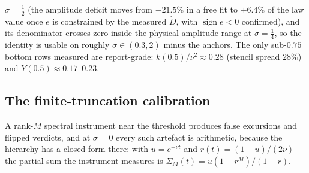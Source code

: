 \documentclass[11pt,a4paper]{article}
\theoremstyle{plain}
\theoremstyle{definition}
\begin{document}
$\sigma=\tfrac12$ (the amplitude deficit moves from $-21.5\%$ in a free fit to $+6.4\%$ of the law value once $e$ is constrained by the measured $\dot D$, with $\operatorname{sign}e<0$ confirmed), and its denominator crosses zero inside the physical amplitude range at $\sigma=\tfrac14$, so the identity is usable on roughly $\sigma\in(0.3,2)$ minus the anchors. The only sub-$0.75$ bottom rows measured are report-grade: $k(0.5)/\nu^2\approx0.28$ (stencil spread $28\%$) and $Y(0.5)\approx0.17$--$0.23$.

\subsection{The finite-truncation calibration}\label{sec:calibration}
A rank-$M$ spectral instrument near the threshold produces false excursions and flipped verdicts, and at $\sigma=0$ every such artefact is arithmetic, because the hierarchy has a closed form there: with $u=e^{-\nu t}$ and $r(t)=(1-u)/(2\nu)$ the partial sum the instrument measures is $\Sigma_M(t)=u(1-r^M)/(1-r)$.
\end{document}
